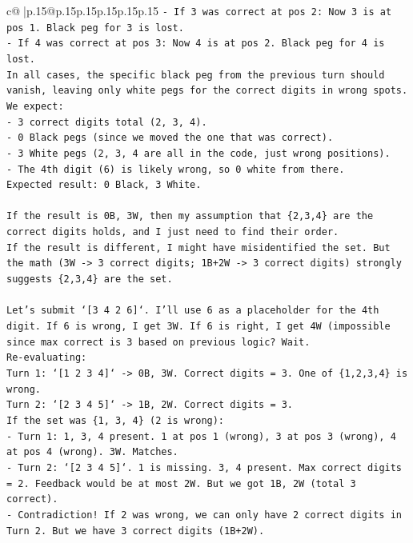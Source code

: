 \documentclass{article}
\begin{document}
{\begin{supertabular}{c@{$\;$}|p{.15\linewidth}@{}p{.15\linewidth}p{.15\linewidth}p{.15\linewidth}p{.15\linewidth}p{.15\linewidth}}
{{{\texttt{{-} If 3 was correct at pos 2: Now 3 is at pos 1. Black peg for 3 is lost.} \\
\texttt{{-} If 4 was correct at pos 3: Now 4 is at pos 2. Black peg for 4 is lost.} \\
\texttt{In all cases, the specific black peg from the previous turn should vanish, leaving only white pegs for the correct digits in wrong spots.} \\
\texttt{We expect:} \\
\texttt{{-} 3 correct digits total (2, 3, 4).} \\
\texttt{{-} 0 Black pegs (since we moved the one that was correct).} \\
\texttt{{-} 3 White pegs (2, 3, 4 are all in the code, just wrong positions).} \\
\texttt{{-} The 4th digit (6) is likely wrong, so 0 white from there.} \\
\texttt{Expected result: 0 Black, 3 White.} \\
\\ 
\texttt{If the result is 0B, 3W, then my assumption that \{2,3,4\} are the correct digits holds, and I just need to find their order.} \\
\texttt{If the result is different, I might have misidentified the set. But the math (3W {-}> 3 correct digits; 1B+2W {-}> 3 correct digits) strongly suggests \{2,3,4\} are the set.} \\
\\ 
\texttt{Let's submit `{[}3 4 2 6{]}`. I'll use 6 as a placeholder for the 4th digit. If 6 is wrong, I get 3W. If 6 is right, I get 4W (impossible since max correct is 3 based on previous logic? Wait.} \\
\texttt{Re{-}evaluating:} \\
\texttt{Turn 1: `{[}1 2 3 4{]}` {-}> 0B, 3W. Correct digits = 3. One of \{1,2,3,4\} is wrong.} \\
\texttt{Turn 2: `{[}2 3 4 5{]}` {-}> 1B, 2W. Correct digits = 3.} \\
\texttt{If the set was \{1, 3, 4\} (2 is wrong):} \\
\texttt{{-} Turn 1: 1, 3, 4 present. 1 at pos 1 (wrong), 3 at pos 3 (wrong), 4 at pos 4 (wrong). 3W. Matches.} \\
\texttt{{-} Turn 2: `{[}2 3 4 5{]}`. 1 is missing. 3, 4 present. Max correct digits = 2. Feedback would be at most 2W. But we got 1B, 2W (total 3 correct).} \\
\texttt{{-} Contradiction! If 2 was wrong, we can only have 2 correct digits in Turn 2. But we have 3 correct digits (1B+2W).} \\
}}}
\end{supertabular}}
\end{document}
